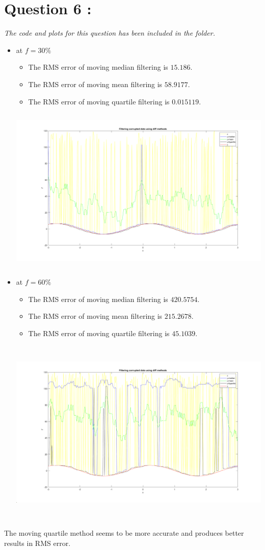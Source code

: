 \documentclass[11pt,a4paper,titlepage]{article}
\begin{document}
{\section{Question 6 : }{
\textit{The code and plots for this question has been included in the folder.} \\
\begin{itemize}
    \item at $f = 30\%$
    \begin{itemize}
        \item The RMS error of moving median filtering is $15.186$.
        \item The RMS error of moving mean filtering is $58.9177$.
        \item The RMS error of moving quartile filtering is $0.015119$.
    \end{itemize}
    \includegraphics[width=15cm, height=8cm]{images/q6_1.png}
    \item at $f = 60\%$
    \begin{itemize}
        \item The RMS error of moving median filtering is $420.5754$.
        \item The RMS error of moving mean filtering is $215.2678$.
        \item The RMS error of moving quartile filtering is $45.1039$.
    \end{itemize}
    \includegraphics[width=15cm, height=9cm]{images/q6_2.png}
\end{itemize}
The moving quartile method seems to be more accurate and produces better results in RMS error. \\

}}
\end{document}
